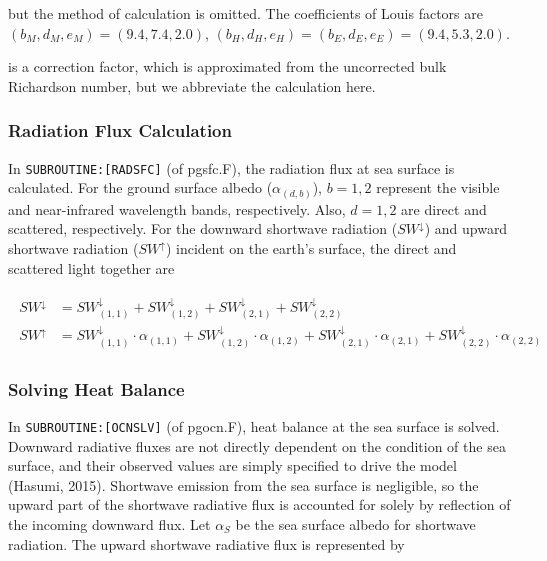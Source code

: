 but the method of calculation is omitted. The coefficients of Louis factors are \(( b_M, d_M, e_M ) = ( 9.4, 7.4, 2.0 )\), \(( b_H, d_H, e_H ) = ( b_E, d_E, e_E ) = ( 9.4, 5.3, 2.0 )\).

is a correction factor, which is approximated from the uncorrected bulk Richardson number, but we abbreviate the calculation here.

\hypertarget{radiation-flux-calculation}{%
\subsubsection{Radiation Flux Calculation}\label{radiation-flux-calculation}}

In \texttt{SUBROUTINE:{[}RADSFC{]}} (of pgsfc.F), the radiation flux at sea surface is calculated. For the ground surface albedo (\(\alpha_{(d,b)}\)), \(b=1,2\) represent the visible and near-infrared
wavelength bands, respectively. Also, \(d=1,2\) are direct and scattered, respectively. For the downward shortwave radiation (\(SW^\downarrow\)) and upward shortwave radiation (\(SW^\uparrow\))
incident on the earth's surface, the direct and scattered light together are

\begin{eqnarray}
\begin{array}{rl}
    SW^\downarrow &= SW^\downarrow_{(1,1)}+SW^\downarrow_{(1,2)}+SW^\downarrow_{(2,1)}+SW^\downarrow_{(2,2)}\\
SW^\uparrow &= SW^\downarrow_{(1,1)}\cdot\alpha_{(1,1)}+SW^\downarrow_{(1,2)}\cdot\alpha_{(1,2)}+SW^\downarrow_{(2,1)}\cdot\alpha_{(2,1)}+SW^\downarrow_{(2,2)}\cdot\alpha_{(2,2)}
\end{array}
\end{eqnarray}

\hypertarget{solving-heat-balance}{%
\subsubsection{Solving Heat Balance}\label{solving-heat-balance}}

In \texttt{SUBROUTINE:{[}OCNSLV{]}} (of pgocn.F), heat balance at the sea surface is solved. Downward radiative fluxes are not directly dependent on the condition of the sea surface, and their
observed values are simply specified to drive the model (Hasumi, 2015). Shortwave emission from the sea surface is negligible, so the upward part of the shortwave radiative flux is accounted for
solely by reflection of the incoming downward flux. Let \(\alpha _S\) be the sea surface albedo for shortwave radiation. The upward shortwave radiative flux is represented by

